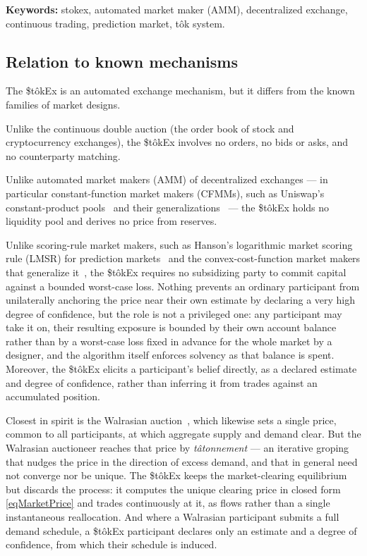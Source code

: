 \documentclass[letterpaper]{article}
\newcommand{\StokEx}{\$t\^{o}kEx}
\newcommand{\tok}{t\^{o}k}
\begin{document}
\textbf{Keywords:} stokex, automated market maker (AMM), decentralized exchange, continuous trading, prediction market, \tok{} system.

\subsection*{Relation to known mechanisms}
The \StokEx{} is an automated exchange mechanism, but it differs from the known families of market designs.

Unlike the continuous double auction (the order book of stock and cryptocurrency exchanges), the \StokEx{} involves no orders, no bids or asks, and no counterparty matching.

Unlike automated market makers (AMM) of decentralized exchanges --- in particular constant-function market makers (CFMMs), such as Uniswap's constant-product pools~\cite{UniswapV2} and their generalizations~\cite{AngerisChitra2020} --- the \StokEx{} holds no liquidity pool and derives no price from reserves.

Unlike scoring-rule market makers, such as Hanson's logarithmic market scoring rule (LMSR) for prediction markets~\cite{Hanson2003} and the convex-cost-function market makers that generalize it~\cite{AbernethyChenVaughan2013}, the \StokEx{} requires no subsidizing party to commit capital against a bounded worst-case loss. Nothing prevents an ordinary participant from unilaterally anchoring the price near their own estimate by declaring a very high degree of confidence, but the role is not a privileged one: any participant may take it on, their resulting exposure is bounded by their own account balance rather than by a worst-case loss fixed in advance for the whole market by a designer, and the algorithm itself enforces solvency as that balance is spent. Moreover, the \StokEx{} elicits a participant's belief directly, as a declared estimate and degree of confidence, rather than inferring it from trades against an accumulated position.

Closest in spirit is the Walrasian auction~\cite{Walras1874}, which likewise sets a single price, common to all participants, at which aggregate supply and demand clear. But the Walrasian auctioneer reaches that price by \emph{tâtonnement} --- an iterative groping that nudges the price in the direction of excess demand, and that in general need not converge nor be unique. The \StokEx{} keeps the market-clearing equilibrium but discards the process: it computes the unique clearing price in closed form \eqref{eqMarketPrice} and trades continuously at it, as flows rather than a single instantaneous reallocation. And where a Walrasian participant submits a full demand schedule, a \StokEx{} participant declares only an estimate and a degree of confidence, from which their schedule is induced.
\end{document}
